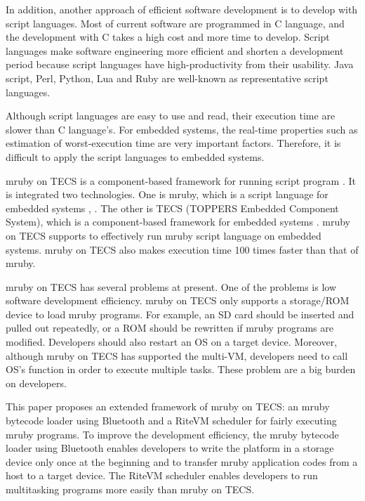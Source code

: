 \documentclass{sig-alternate-05-2015}
\begin{document}
In addition, another approach of efficient software development is to develop with script languages.
Most of current software are programmed in C language, and the development with C takes a high cost and more time to develop.
Script languages make software engineering more efficient and shorten a development period because script languages have high-productivity from their usability.
Java script, Perl, Python, Lua and Ruby are well-known as representative script languages.

Although script languages are easy to use and read, their execution time are slower than C language's.
For embedded systems, the real-time properties such as estimation of worst-execution time are very important factors.
Therefore, it is difficult to apply the script languages to embedded systems.

mruby on TECS is a component-based framework for running script program \cite{par:mrubyonTECS}.
It is integrated two technologies.
One is mruby, which is a script language for embedded systems \cite{par:mruby}, \cite{url:mruby}.
The other is TECS (TOPPERS Embedded Component System), which is a component-based framework for embedded systems \cite{par:TECS} \cite{url:TOPPERS}.
mruby on TECS supports to effectively run mruby script language on embedded systems.
mruby on TECS also makes execution time 100 times faster than that of mruby.

mruby on TECS has several problems at present.
One of the problems is low software development efficiency.
mruby on TECS only supports a storage/ROM device to load mruby programs. 
For example, an SD card should be inserted and pulled out repeatedly, or a ROM should be rewritten if mruby programs are modified.
Developers should also restart an OS on a target device.
Moreover, although mruby on TECS has supported the multi-VM, developers need to call OS's function in order to execute multiple tasks.
These problem are a big burden on developers.

This paper proposes an extended framework of mruby on TECS: an mruby bytecode loader using Bluetooth and a RiteVM scheduler for fairly executing mruby programs.
To improve the development efficiency, the mruby bytecode loader using Bluetooth enables developers to write the platform in a storage device only once at the beginning and to transfer mruby application codes from a host to a target device.
The RiteVM scheduler enables developers to run multitasking programs more easily than mruby on TECS.
\end{document}
